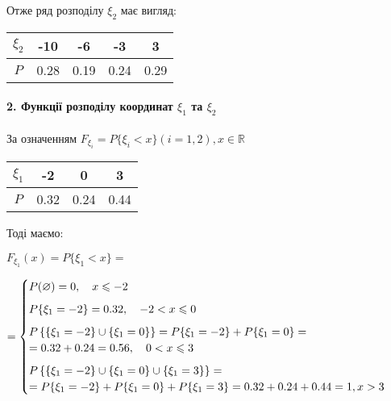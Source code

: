 \documentclass[a4paper, 20pt, titlepage]{article}
\begin{document}
\hspace{-6mm} Отже ряд розподілу $\xi_2$ має вигляд:
\begin{center}
\begin{tabular}{|c|c|c|c|c|}
\hline 
$\xi_2$ & -10& -6 & -3 & 3 \\ \hline
$P$ & 0.28 & 0.19 & 0.24 & 0.29\\ \hline 
\end{tabular}
\end{center}

\vspace{4mm}

\paragraph{2. Функції розподілу координат $\xi_1$ та $\xi_2$}
\hfill \break

За означенням $F_{\xi_i} = P\{\xi_i < x\} (i = 1,2), x \in \mathbb{R}$

\begin{center}
\begin{tabular}{|c|c|c|c|}
\hline 
$\xi_1$ & -2 & 0 & 3 \\ \hline
$P$ & 0.32 & 0.24 & 0.44 \\ \hline 
\end{tabular}
\end{center}

Тоді маємо:

$F_{\xi_1}(x) = P\{\xi_1 < x\} = $

\begin{flushleft}
$
 =\nolinebreak 
	\begin{cases}
		\vspace{2mm}
		P(\varnothing) = 0, \quad x \leqslant -2 \\ \vspace{2mm} 
		P\{\xi_1 = -2\} = 0.32,  \quad  -2 < x \leqslant 0 \\   
		P\left\{\{\xi_1 = -2\} \cup \{\xi_1 = 0\} \right\} = P\{\xi_1 = -2\} + P\{\xi_1 = 0\} = \\ \vspace{2mm} = 0.32 + 0.24 = 0.56, \quad 0 < x \leqslant 3 \\ 
		P\left\{\{\xi_1 = -2\} \cup \{\xi_1 = 0\} \cup \{\xi_1 = 3\} \right\} = \\
		 = P\{\xi_1 = -2\} + P\{\xi_1 = 0\} + P\{\xi_1 = 3\} = 0.32 + 0.24 + 0.44 = 1, x > 3

	\end{cases}
$
\end{flushleft}
\end{document}
